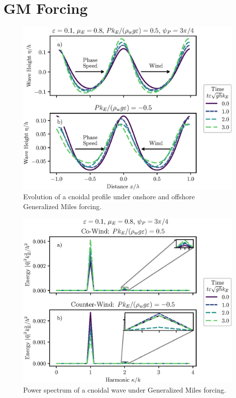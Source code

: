 \documentclass{jfm}
\let\Oldsection\section
\renewcommand{\section}{\FloatBarrier\Oldsection}
\begin{document}
\section{GM Forcing}
\begin{figure}
  \centering
  \includegraphics{Snapshots-Positive-Negative-Cnoidal-GM.eps}
  \caption{
    Evolution of a cnoidal profile under onshore and offshore Generalized
    Miles forcing.
  }
\end{figure}

\begin{figure}
  \centering
  \includegraphics{Power-Spectrum-GM.eps}
  \caption{
    Power spectrum of a cnoidal wave under Generalized Miles forcing.
  }
\end{figure}
\end{document}
